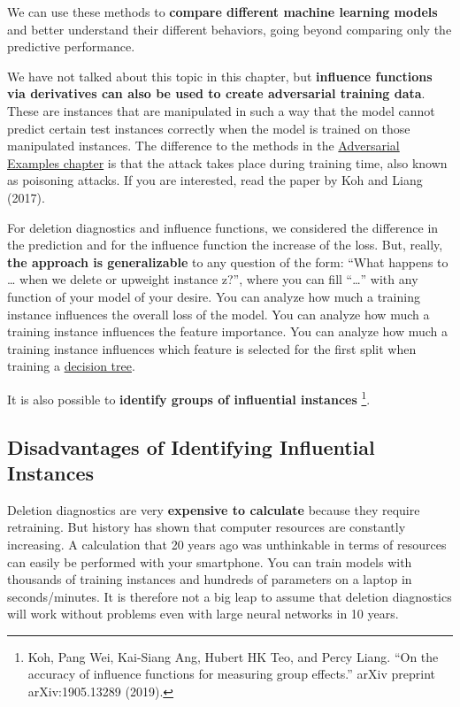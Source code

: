 \documentclass[
  10pt,
]{scrbook}
\begin{document}
We can use these methods to \textbf{compare different machine learning models} and better understand their different behaviors, going beyond comparing only the predictive performance.

We have not talked about this topic in this chapter, but \textbf{influence functions via derivatives can also be used to create adversarial training data}.
These are instances that are manipulated in such a way that the model cannot predict certain test instances correctly when the model is trained on those manipulated instances.
The difference to the methods in the \protect\hyperlink{adversarial}{Adversarial Examples chapter} is that the attack takes place during training time, also known as poisoning attacks.
If you are interested, read the paper by Koh and Liang (2017).

For deletion diagnostics and influence functions, we considered the difference in the prediction and for the influence function the increase of the loss.
But, really, \textbf{the approach is generalizable} to any question of the form:
``What happens to \ldots{} when we delete or upweight instance z?'', where you can fill ``\ldots{}'' with any function of your model of your desire.
You can analyze how much a training instance influences the overall loss of the model.
You can analyze how much a training instance influences the feature importance.
You can analyze how much a training instance influences which feature is selected for the first split when training a \protect\hyperlink{tree}{decision tree}.

It is also possible to \textbf{identify groups of influential instances} \footnote{Koh, Pang Wei, Kai-Siang Ang, Hubert HK Teo, and Percy Liang. ``On the accuracy of influence functions for measuring group effects.'' arXiv preprint arXiv:1905.13289 (2019).}.

\hypertarget{disadvantages-of-identifying-influential-instances}{%
\subsection{Disadvantages of Identifying Influential Instances}\label{disadvantages-of-identifying-influential-instances}}

Deletion diagnostics are very \textbf{expensive to calculate} because they require retraining.
But history has shown that computer resources are constantly increasing.
A calculation that 20 years ago was unthinkable in terms of resources can easily be performed with your smartphone.
You can train models with thousands of training instances and hundreds of parameters on a laptop in seconds/minutes.
It is therefore not a big leap to assume that deletion diagnostics will work without problems even with large neural networks in 10 years.
\end{document}
